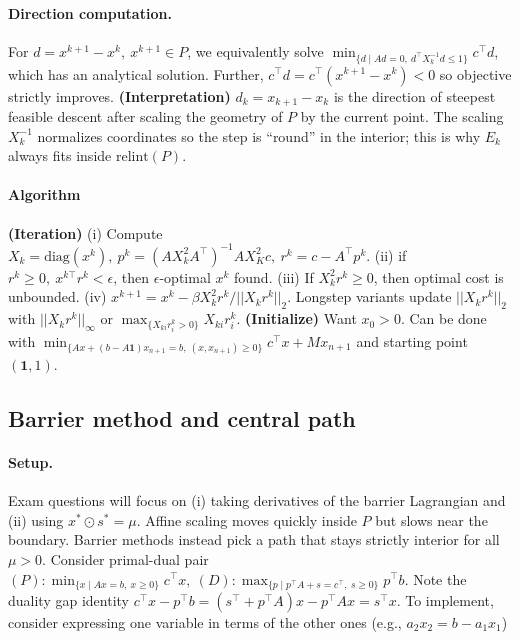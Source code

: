 \documentclass{article}
\begin{document}
\paragraph{Direction computation.} For $d = x^{k+1} - x^k,\ x^{k+1}\in P$, we equivalently solve $\min_{\{d\mid Ad=0,\ d^\top X_k^{-1}d \leq 1\}}c^\top d$, which has an analytical solution. Further, $c^\top d = c^\top (x^{k+1} - x^k) < 0$ so objective strictly improves. \textbf{(Interpretation)} $d_k = x_{k+1}-x_k$ is the direction of steepest feasible descent after scaling the geometry of $P$ by the current point. The scaling $X_k^{-1}$ normalizes coordinates so the step is “round” in the interior; this is why $E_k$ always fits inside $\text{relint}(P)$.

\paragraph{Algorithm} \textbf{(Iteration)} (i) Compute $X_k = \text{diag}(x^k),\ p^k = (AX_k^2A^\top)^{-1}AX_K^2c,\ r^k = c - A^\top p^k$. (ii) if $r^k\geq 0,\ x^{k\top}r^k < \epsilon$, then $\epsilon$-optimal $x^k$ found. (iii) If $X^{2}_kr^k \geq 0$, then optimal cost is unbounded. (iv) $x^{k+1} = x^k - \beta X_k^2r^k / ||X_kr^k||_2$. Longstep variants update $||X_kr^k||_2$ with $||X_kr^k||_\infty$ or $\max_{\{X_{ki}r^k_i > 0\}}X_{ki}r^k_i$. \textbf{(Initialize)} Want $x_0 > 0$. Can be done with $\min_{\{Ax + (b - A\mathbf{1})x_{n+1} = b,\ (x,x_{n+1})\geq 0\}} c^\top x + Mx_{n+1}$ and starting point $(\mathbf{1}, 1)$.

\subsection{Barrier method and central path}
\paragraph{Setup.}
Exam questions will focus on (i) taking derivatives of the barrier Lagrangian and
(ii) using $x^*\odot s^*=\mu$.  
Affine scaling moves quickly inside $P$ but slows near the boundary.  
Barrier methods instead pick a path that stays strictly interior for all $\mu>0$.
Consider primal-dual pair $(P): \min_{\{x\mid Ax=b,\ x\geq 0\}}c^\top x,\ (D): \max_{\{p\mid p^\top A + s = c^\top,\ s\geq 0\}}p^\top b$. Note the duality gap identity $c^\top x - p^\top b = (s^\top + p^\top A)x - p^\top Ax = s^\top x$. To implement, consider expressing one variable in terms of the other ones (e.g., $a_2x_2 = b - a_1x_1$)
\end{document}
